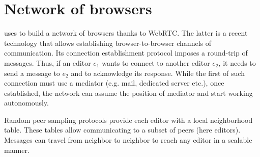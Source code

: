 
\section{Network of browsers}
\label{sec:network}

\CRATE uses \SPRAY to build a network of browsers thanks to WebRTC. The latter
is a recent technology that allows establishing browser-to-browser channels of
communication. Its connection establishment protocol imposes a round-trip of
messages. Thus, if an editor $e_1$ wants to connect to another editor $e_2$, it
needs to send a message to $e_2$ and to acknowledge its response. While the
first of such connection must use a mediator (e.g. mail, dedicated server etc.),
once established, the network can assume the position of mediator and start
working autonomously.

Random peer sampling protocols provide each editor with a local neighborhood
table. These tables allow communicating to a subset of peers (here
editors). Messages can travel from neighbor to neighbor to reach any editor in a
scalable manner.



